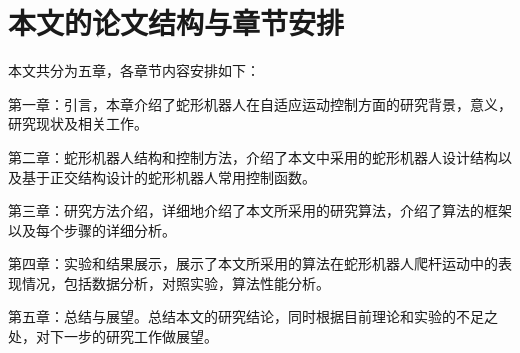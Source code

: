 \section{本文的论文结构与章节安排}

\label{sec:arrangement}
本文共分为五章，各章节内容安排如下：

第一章：引言，本章介绍了蛇形机器人在自适应运动控制方面的研究背景，意义，研究现状及相关工作。

第二章：蛇形机器人结构和控制方法，介绍了本文中采用的蛇形机器人设计结构以及基于正交结构设计的蛇形机器人常用控制函数。

第三章：研究方法介绍，详细地介绍了本文所采用的研究算法，介绍了算法的框架以及每个步骤的详细分析。

第四章：实验和结果展示，展示了本文所采用的算法在蛇形机器人爬杆运动中的表现情况，包括数据分析，对照实验，算法性能分析。

第五章：总结与展望。总结本文的研究结论，同时根据目前理论和实验的不足之处，对下一步的研究工作做展望。


